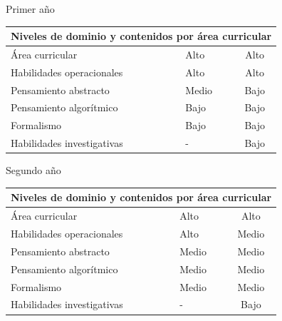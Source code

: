 ﻿\newpage
Primer año

\begin{table}[H]
\begin{center}
\begin{tabular}{|ccc|}
\hline
\multicolumn{3}{|c|}{\cellcolor[HTML]{00C0F3} \textbf{Niveles de dominio y contenidos por área curricular}} \\ \hline
\multicolumn{1}{|l|}{Área curricular} & \multicolumn{1}{l|}{Alto} & Alto \\ \hline
\multicolumn{1}{|l|}{Habilidades operacionales} & \multicolumn{1}{l|}{Alto} & Alto \\ \hline
\multicolumn{1}{|l|}{Pensamiento abstracto} & \multicolumn{1}{l|}{Medio} & Bajo \\ \hline
\multicolumn{1}{|l|}{Pensamiento algorítmico} & \multicolumn{1}{l|}{Bajo} & Bajo \\ \hline
\multicolumn{1}{|l|}{Formalismo} & \multicolumn{1}{l|}{Bajo} & Bajo \\ \hline
\multicolumn{1}{|l|}{Habilidades investigativas} & \multicolumn{1}{l|}{-} & Bajo \\ \hline
\end{tabular}
\end{center}
\end{table}

Segundo año

\begin{table}[H]
\begin{center}
\begin{tabular}{|ccc|}
\hline
\multicolumn{3}{|c|}{\cellcolor[HTML]{00C0F3} \textbf{Niveles de dominio y contenidos por área curricular}} \\ \hline
\multicolumn{1}{|l|}{Área curricular} & \multicolumn{1}{l|}{Alto} & Alto \\ \hline
\multicolumn{1}{|l|}{Habilidades operacionales} & \multicolumn{1}{l|}{Alto} & Medio \\ \hline
\multicolumn{1}{|l|}{Pensamiento abstracto} & \multicolumn{1}{l|}{Medio} & Medio \\ \hline
\multicolumn{1}{|l|}{Pensamiento algorítmico} & \multicolumn{1}{l|}{Medio} & Medio \\ \hline
\multicolumn{1}{|l|}{Formalismo} & \multicolumn{1}{l|}{Medio} & Medio \\ \hline
\multicolumn{1}{|l|}{Habilidades investigativas} & \multicolumn{1}{l|}{-} & Bajo \\ \hline
\end{tabular}
\end{center}
\end{table}

